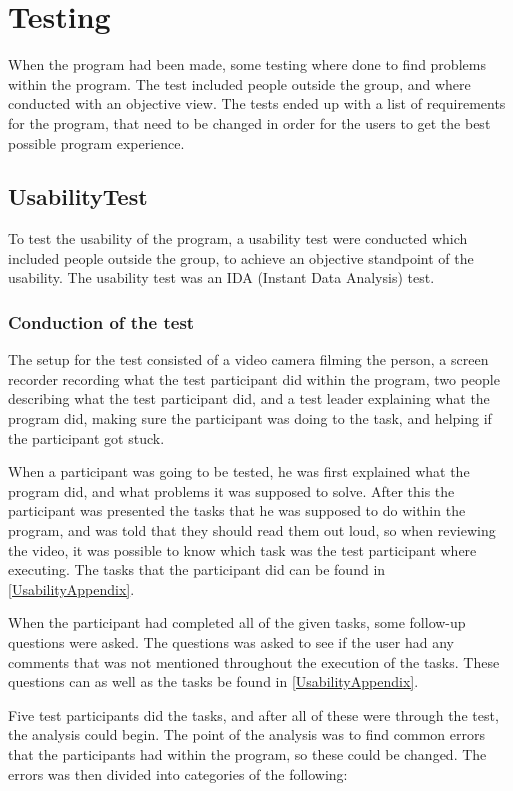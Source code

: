 \chapter{Testing}

When the program had been made, some testing where done to find problems within the program. The test included people outside the group, and where conducted with an objective view. The tests ended up with a list of requirements for the program, that need to be changed in order for the users to get the best possible program experience.

\section{UsabilityTest}

To test the usability of the program, a usability test were conducted which included people outside the group, to achieve an objective standpoint of the usability. The usability test was an IDA (Instant Data Analysis) test.

\subsection{Conduction of the test}

The setup for the test consisted of a video camera filming the person, a screen recorder recording what the test participant did within the program, two people describing what the test participant did, and a test leader explaining what the program did, making sure the participant was doing to the task, and helping if the participant got stuck.

When a participant was going to be tested, he was first explained what the program did, and what problems it was supposed to solve. After this the participant was presented the tasks that he was supposed to do within the program, and was told that they should read them out loud, so when reviewing the video, it was possible to know which task was the test participant where executing. The tasks that the participant did can be found in \cref{UsabilityAppendix}.

When the participant had completed all of the given tasks, some follow-up questions were asked. The questions was asked to see if the user had any comments that was not mentioned throughout the execution of the tasks. These questions can as well as the tasks be found in \cref{UsabilityAppendix}.

Five test participants did the tasks, and after all of these were through the test, the analysis could begin. The point of the analysis was to find common errors that the participants had within the program, so these could be changed. The errors was then divided into categories of the following:


